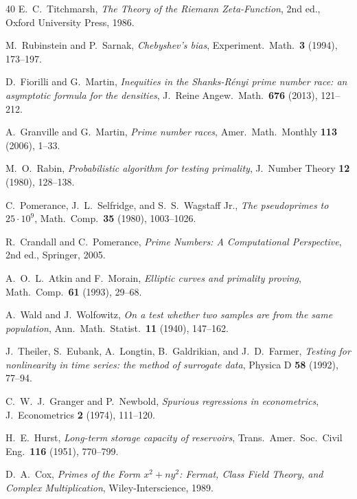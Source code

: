\documentclass[11pt,a4paper]{article}
\theoremstyle{plain}
\theoremstyle{definition}
\begin{document}
\begin{thebibliography}{40}
 E.~C.~Titchmarsh, \textit{The Theory of the Riemann
Zeta-Function}, 2nd ed., Oxford University Press, 1986.

 M.~Rubinstein and P.~Sarnak, \textit{Chebyshev's bias},
Experiment.\ Math.\ \textbf{3} (1994), 173--197.

 D.~Fiorilli and G.~Martin, \textit{Inequities in the
Shanks-R\'{e}nyi prime number race: an asymptotic formula for the densities},
J.\ Reine Angew.\ Math.\ \textbf{676} (2013), 121--212.

 A.~Granville and G.~Martin, \textit{Prime number
races}, Amer.\ Math.\ Monthly \textbf{113} (2006), 1--33.

 M.~O.~Rabin, \textit{Probabilistic algorithm for testing
primality}, J.\ Number Theory \textbf{12} (1980), 128--138.

 C.~Pomerance, J.~L.~Selfridge, and S.~S.~Wagstaff Jr., \textit{The
pseudoprimes to $25 \cdot 10^9$}, Math.\ Comp.\ \textbf{35} (1980), 1003--1026.

 R.~Crandall and C.~Pomerance, \textit{Prime Numbers: A
Computational Perspective}, 2nd ed., Springer, 2005.

 A.~O.~L.~Atkin and F.~Morain, \textit{Elliptic curves and
primality proving}, Math.\ Comp.\ \textbf{61} (1993), 29--68.

 A.~Wald and J.~Wolfowitz, \textit{On a test whether two samples
are from the same population}, Ann.\ Math.\ Statist.\ \textbf{11} (1940),
147--162.

 J.~Theiler, S.~Eubank, A.~Longtin, B.~Galdrikian, and J.~D.~Farmer,
\textit{Testing for nonlinearity in time series: the method of surrogate data},
Physica D \textbf{58} (1992), 77--94.

 C.~W.~J.~Granger and P.~Newbold, \textit{Spurious regressions
in econometrics}, J.\ Econometrics \textbf{2} (1974), 111--120.

 H.~E.~Hurst, \textit{Long-term storage capacity of reservoirs},
Trans.\ Amer.\ Soc.\ Civil Eng.\ \textbf{116} (1951), 770--799.

 D.~A.~Cox, \textit{Primes of the Form $x^2 + ny^2$: Fermat, Class
Field Theory, and Complex Multiplication}, Wiley-Interscience, 1989.


\end{thebibliography}
\end{document}
